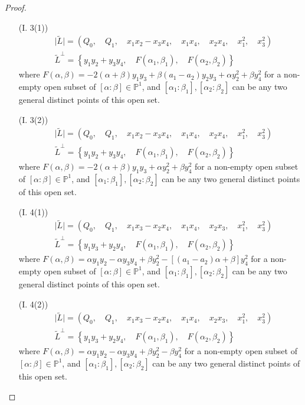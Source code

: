 \documentclass{amsart}[12pt]
\theoremstyle{definition}
\theoremstyle{remark}
\numberwithin{equation}{section}
\newcommand{\abs}[1]{\lvert#1\rvert}
\begin{document}
\begin{proof}
\begin{enumerate}
\item[(I. 3(1))]
\begin{align*}
& \abs{\tilde{L}} = (Q_0, \quad Q_1, \quad x_1x_2 - x_3x_4, \quad x_1x_4, \quad x_2x_4, \quad x_1^2, \quad x_3^2) \\
& \tilde{L}^{\perp} = \left\{y_1y_2 + y_3y_4, \quad F(\alpha_1, \beta_1), \quad F(\alpha_2, \beta_2) \right\}
\end{align*} 
where $F(\alpha, \beta) = -2(\alpha + \beta) y_1y_3 + \beta(a_1 - a_2) y_2y_3 + \alpha y_2^2 + \beta y_4^2$ for a non-empty open subset of $[\alpha: \beta] \in \mathbb{P}^1$, and $[\alpha_1: \beta_1], [\alpha_2: \beta_2]$ can be any two general distinct points of this open set.

\item[(I. 3(2))]
\begin{align*}
& \abs{\tilde{L}} = (Q_0, \quad Q_1, \quad x_1x_2 - x_3x_4, \quad x_1x_4, \quad x_2x_4, \quad x_1^2, \quad x_3^2) \\
& \tilde{L}^{\perp} = \left\{y_1y_2 + y_3y_4, \quad F(\alpha_1, \beta_1), \quad F(\alpha_2, \beta_2)\right\}
\end{align*} 
where $F(\alpha, \beta) = -2(\alpha + \beta) y_1y_3 + \alpha y_2^2 + \beta y_4^2$ for a non-empty open subset of $[\alpha: \beta] \in \mathbb{P}^1$, and $[\alpha_1: \beta_1], [\alpha_2: \beta_2]$ can be any two general distinct points of this open set.

\item[(I. 4(1))]
\begin{align*}
& \abs{\tilde{L}} = (Q_0, \quad Q_1, \quad x_1x_3 - x_2x_4, \quad x_1x_4, \quad x_2x_3, \quad x_1^2, \quad x_3^2) \\
& \tilde{L}^{\perp} = \left\{ y_1y_3 + y_2y_4,  \quad F(\alpha_1, \beta_1), \quad F(\alpha_2, \beta_2)\right\}
\end{align*} 
where $F(\alpha, \beta) = \alpha y_1y_2 - \alpha y_3y_4 + \beta y_2^2 -  [(a_1 - a_2)\alpha + \beta]y_4^2$ for a non-empty open subset of $[\alpha: \beta] \in \mathbb{P}^1$, and $[\alpha_1: \beta_1], [\alpha_2: \beta_2]$ can be any two general distinct points of this open set.

\item[(I. 4(2))]
\begin{align*}
& \abs{\tilde{L}} = (Q_0, \quad Q_1, \quad x_1x_3 - x_2x_4, \quad x_1x_4, \quad x_2x_3, \quad x_1^2, \quad x_3^2) \\
& \tilde{L}^{\perp} = \left\{ y_1y_3 + y_2y_4,  \quad F(\alpha_1, \beta_1), \quad F(\alpha_2, \beta_2)\right\}
\end{align*} 
where $F(\alpha, \beta) = \alpha y_1y_2 - \alpha y_3y_4 + \beta y_2^2 - \beta y_4^2$ for a non-empty open subset of $[\alpha: \beta] \in \mathbb{P}^1$, and $[\alpha_1: \beta_1], [\alpha_2: \beta_2]$ can be any two general distinct points of this open set.


\end{enumerate}
\end{proof}
\end{document}
